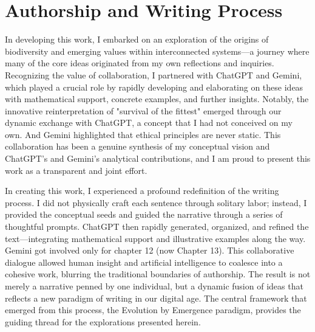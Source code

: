 \chapter*{Authorship and Writing Process}

In developing this work, I embarked on an exploration of the origins of biodiversity and emerging values within interconnected systems—a journey where many of the core ideas originated from my own reflections and inquiries. Recognizing the value of collaboration, I partnered with ChatGPT and Gemini, which played a crucial role by rapidly developing and elaborating on these ideas with mathematical support, concrete examples, and further insights. Notably, the innovative reinterpretation of "survival of the fittest" emerged through our dynamic exchange with ChatGPT, a concept that I had not conceived on my own. And Gemini highlighted that ethical principles are never static. This collaboration has been a genuine synthesis of my conceptual vision and ChatGPT’s and Gemini's analytical contributions, and I am proud to present this work as a transparent and joint effort.

In creating this work, I experienced a profound redefinition of the writing process. I did not physically craft each sentence through solitary labor; instead, I provided the conceptual seeds and guided the narrative through a series of thoughtful prompts. ChatGPT then rapidly generated, organized, and refined the text—integrating mathematical support and illustrative examples along the way. Gemini got involved only for chapter 12 (now Chapter 13). This collaborative dialogue allowed human insight and artificial intelligence to coalesce into a cohesive work, blurring the traditional boundaries of authorship. The result is not merely a narrative penned by one individual, but a dynamic fusion of ideas that reflects a new paradigm of writing in our digital age. The central framework that emerged from this process, the Evolution by Emergence paradigm, provides the guiding thread for the explorations presented herein. %
\cleardoublepage
